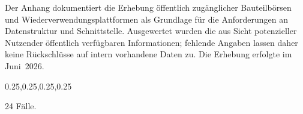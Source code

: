 \label{anlage:bauteilboersen}

Der Anhang dokumentiert die Erhebung öffentlich zugänglicher Bauteilbörsen und Wiederverwendungsplattformen als Grundlage für die Anforderungen an Datenstruktur und Schnittstelle. Ausgewertet wurden die aus Sicht potenzieller Nutzender öffentlich verfügbaren Informationen; fehlende Angaben lassen daher keine Rückschlüsse auf intern vorhandene Daten zu. Die Erhebung erfolgte im Juni~2026.

\begin{Table}[title=Überblick]
\begin{SemioTable}{0.25,0.25,0.25,0.25}
\end{SemioTable}
\end{Table}


24 Fälle.


